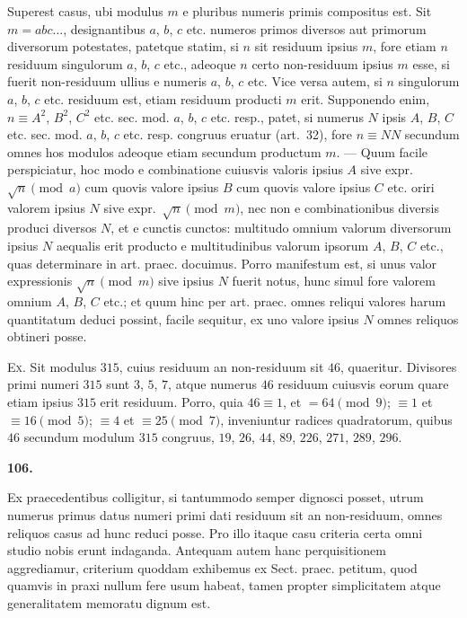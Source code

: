\documentclass[12pt,a4paper]{article}
\theoremstyle{plain}
\theoremstyle{definition}
\theoremstyle{remark}
\begin{document}
Superest casus, ubi modulus $m$ e pluribus numeris primis compositus est. Sit $m = abc\ldots$, designantibus $a$, $b$, $c$ etc. numeros primos diversos aut primorum diversorum potestates, patetque statim, si $n$ sit residuum ipsius $m$, fore etiam $n$ residuum singulorum $a$, $b$, $c$ etc., adeoque $n$ certo non-residuum ipsius $m$ esse, si fuerit non-residuum ullius e numeris $a$, $b$, $c$ etc. Vice versa autem, si $n$ singulorum $a$, $b$, $c$ etc. residuum est, etiam residuum producti $m$ erit. Supponendo enim, $n \equiv A^2$, $B^2$, $C^2$ etc. sec. mod. $a$, $b$, $c$ etc. resp., patet, si numerus $N$ ipsis $A$, $B$, $C$ etc. sec. mod. $a$, $b$, $c$ etc. resp. congruus eruatur (art.~32), fore $n \equiv NN$ secundum omnes hos modulos adeoque etiam secundum productum $m$. --- Quum facile perspiciatur, hoc modo e combinatione cuiusvis valoris ipsius $A$ sive expr.~$\sqrt{n} \pmod{a}$ cum quovis valore ipsius $B$ cum quovis valore ipsius $C$ etc. oriri valorem ipsius $N$ sive expr.~$\sqrt{n} \pmod{m}$, nec non e combinationibus diversis produci diversos $N$, et e cunctis cunctos: multitudo omnium valorum diversorum ipsius $N$ aequalis erit producto e multitudinibus valorum ipsorum $A$, $B$, $C$ etc., quas determinare in art. praec. docuimus. Porro manifestum est, si unus valor expressionis $\sqrt{n} \pmod{m}$ sive ipsius $N$ fuerit notus, hunc simul fore valorem omnium $A$, $B$, $C$ etc.; et quum hinc per art. praec. omnes reliqui valores harum quantitatum deduci possint, facile sequitur, ex uno valore ipsius $N$ omnes reliquos obtineri posse.

\textsc{Ex.} Sit modulus $315$, cuius residuum an non-residuum sit $46$, quaeritur. Divisores primi numeri $315$ sunt $3$, $5$, $7$, atque numerus $46$ residuum cuiusvis eorum quare etiam ipsius $315$ erit residuum. Porro, quia $46 \equiv 1$, et $= 64 \pmod{9}$; $\equiv 1$ et $\equiv 16 \pmod{5}$; $\equiv 4$ et $\equiv 25 \pmod{7}$, inveniuntur radices quadratorum, quibus $46$ secundum modulum $315$ congruus, $19$, $26$, $44$, $89$, $226$, $271$, $289$, $296$.

\setcounter{satz}{106}
\addtocounter{satz}{-1}
\textbf{106.}

Ex praecedentibus colligitur, si tantummodo semper dignosci posset, utrum numerus primus datus numeri primi dati residuum sit an non-residuum, omnes reliquos casus ad hunc reduci posse. Pro illo itaque casu criteria certa omni studio nobis erunt indaganda. Antequam autem hanc perquisitionem aggrediamur, criterium quoddam exhibemus ex Sect. praec. petitum, quod quamvis in praxi nullum fere usum habeat, tamen propter simplicitatem atque generalitatem memoratu dignum est.
\end{document}
